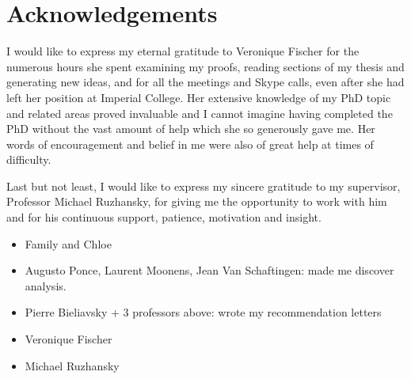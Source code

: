 \chapter*{Acknowledgements}

I would like to express my eternal gratitude to Veronique Fischer for the numerous hours she spent examining my proofs,
reading sections of my thesis and generating new ideas,
and for all the meetings and Skype calls,
even after she had left her position at Imperial College.
Her extensive knowledge of my PhD topic and related areas proved invaluable and I cannot imagine having completed the PhD without the vast amount of help which she so generously gave me.
Her words of encouragement and belief in me were also of great help at times of difficulty.

Last but not least,
I would like to express my sincere gratitude to my supervisor,
Professor Michael Ruzhansky,
for giving me the opportunity to work with him and for his continuous support, patience, motivation and insight.

\begin{itemize}
    \item Family and Chloe
    \item Augusto Ponce, Laurent Moonens, Jean Van Schaftingen: made me discover analysis.
    \item Pierre Bieliavsky + 3 professors above: wrote my recommendation letters
    \item Veronique Fischer
    \item Michael Ruzhansky
\end{itemize}
